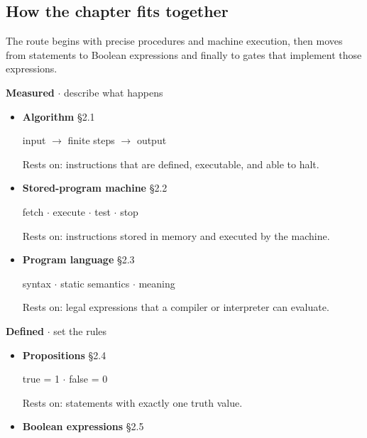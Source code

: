 \documentclass[11pt]{article}
\begin{document}
\begin{keepsection}
\section{How the chapter fits together}

The route begins with precise procedures and machine execution, then moves from statements to Boolean expressions and finally to gates that implement those expressions.

\textbf{Measured} \ensuremath{\cdot} describe what happens

\begin{itemize}
\item {}
\textbf{Algorithm} \hfill{\small\color{FAUblue}§2.1}

input \ensuremath{\to} finite steps \ensuremath{\to} output

Rests on: instructions that are defined, executable, and able to halt.
\item {}
\textbf{Stored-program machine} \hfill{\small\color{FAUblue}§2.2}

fetch \ensuremath{\cdot} execute \ensuremath{\cdot} test \ensuremath{\cdot} stop

Rests on: instructions stored in memory and executed by the machine.
\item {}
\textbf{Program language} \hfill{\small\color{FAUblue}§2.3}

syntax \ensuremath{\cdot} static semantics \ensuremath{\cdot} meaning

Rests on: legal expressions that a compiler or interpreter can evaluate.
\end{itemize}

\textbf{Defined} \ensuremath{\cdot} set the rules

\begin{itemize}
\item {}
\textbf{Propositions} \hfill{\small\color{FAUblue}§2.4}

true = 1 \ensuremath{\cdot} false = 0

Rests on: statements with exactly one truth value.
\item {}
\textbf{Boolean expressions} \hfill{\small\color{FAUblue}§2.5}


\end{itemize}
\end{keepsection}
\end{document}
